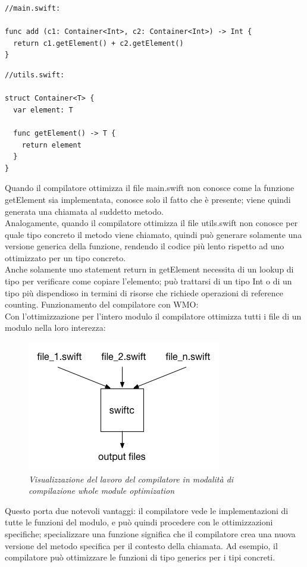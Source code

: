 \begin{lstlisting}
//main.swift:

func add (c1: Container<Int>, c2: Container<Int>) -> Int {
  return c1.getElement() + c2.getElement()
}
\end{lstlisting}
\begin{lstlisting}
//utils.swift:

struct Container<T> {
  var element: T

  func getElement() -> T {
    return element
  }
}
\end{lstlisting}
Quando il compilatore ottimizza il file main.swift non conosce come la funzione getElement sia implementata, conosce solo il fatto che è presente; viene quindi generata una chiamata al suddetto metodo.\\
Analogamente, quando il compilatore ottimizza il file utils.swift non conosce per quale tipo concreto il metodo viene chiamato, quindi può generare solamente una versione generica della funzione, rendendo il codice più lento rispetto ad uno ottimizzato per un tipo concreto.\\
Anche solamente uno statement return in getElement necessita di un lookup di tipo per verificare come copiare l'elemento; può trattarsi di un tipo Int o di un tipo più dispendioso in termini di risorse che richiede operazioni di reference counting.
Funzionamento del compilatore con WMO:\\
Con l'ottimizzazione per l'intero modulo il compilatore ottimizza tutti i file di un modulo nella loro interezza: 
\begin{figure}
      \centering
      \includegraphics[scale=0.80]{immagini/wmo.png}
            \vspace{0.8cm}
            \caption{\textit{Visualizzazione del lavoro del compilatore in modalità di compilazione whole module optimization}}
\end{figure}
Questo porta due notevoli vantaggi: il compilatore vede le implementazioni di tutte le funzioni del modulo, e può quindi procedere con le ottimizzazioni specifiche; specializzare una funzione significa che il compilatore crea una nuova versione del metodo specifica per il contesto della chiamata. Ad esempio, il compilatore può ottimizzare le funzioni di tipo generics per i tipi concreti.\\

